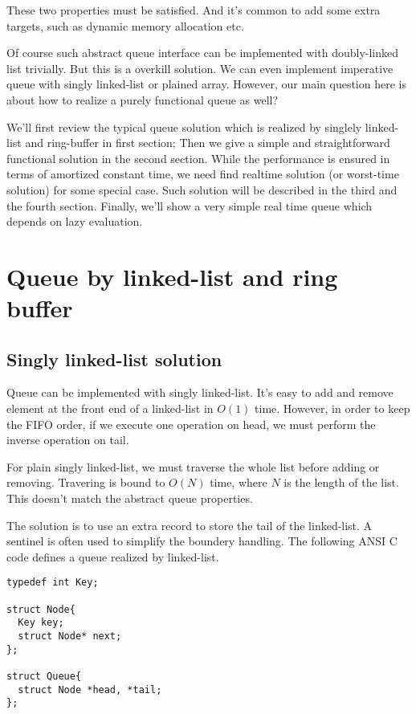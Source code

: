 \documentclass{article}
\begin{document}
These two properties must be satisfied. And it's common to add some extra
targets, such as dynamic memory allocation etc.

Of course such abstract queue interface can be implemented with 
doubly-linked list trivially. But this is a overkill solution. 
We can even implement imperative queue with singly linked-list or
plained array. However, our main question here is about how to realize
a purely functional queue as well?

We'll first review the typical queue solution which is realized by
singlely linked-list and ring-buffer in first section; Then we
give a simple and straightforward functional solution in the second
section. While the performance is ensured in terms of amortized
constant time, we need find realtime solution (or worst-time solution)
for some special case. Such solution will be described in the third
and the fourth section. Finally, we'll show a very simple real time
queue which depends on lazy evaluation.

\section{Queue by linked-list and ring buffer}

\subsection{Singly linked-list solution}

Queue can be implemented with singly linked-list. It's easy to add 
and remove element at the front end of a linked-list in $O(1)$ time. 
However, in
order to keep the FIFO order, if we execute one operation on head,
we must perform the inverse operation on tail.

For plain singly linked-list, we must traverse the whole list before
adding or removing. Travering is bound to $O(N)$ time, 
where $N$ is the length of the list. This doesn't match the abstract
queue properties.

The solution is to use an extra record to store the tail of the linked-list.
A sentinel is often used to simplify the boundery handling. The 
following ANSI C code defines a queue realized by linked-list.

\lstset{language=C}
\begin{lstlisting}
typedef int Key;

struct Node{
  Key key;
  struct Node* next;
};

struct Queue{
  struct Node *head, *tail;
};
\end{lstlisting}
\end{document}
